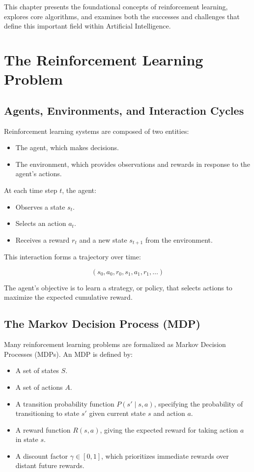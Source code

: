 \documentclass[openany]{book}
\begin{document}
This chapter presents the foundational concepts of reinforcement learning, 
explores core algorithms, and examines both the successes and challenges that 
define this important field within Artificial Intelligence.

\section{The Reinforcement Learning Problem}

\subsection{Agents, Environments, and Interaction Cycles}

Reinforcement learning systems are composed of two entities:

\begin{itemize}
    \item The agent, which makes decisions.
    \item The environment, which provides observations and rewards in response 
    to the agent's actions.
\end{itemize}

At each time step \( t \), the agent:

\begin{itemize}
    \item Observes a state \( s_t \).
    \item Selects an action \( a_t \).
    \item Receives a reward \( r_t \) and a new state \( s_{t+1} \) from the
     environment.
\end{itemize}

This interaction forms a trajectory over time:

\[
(s_0, a_0, r_0, s_1, a_1, r_1, \dots)
\]

The agent's objective is to learn a strategy, or policy, that selects actions 
to maximize the expected cumulative reward.

\subsection{The Markov Decision Process (MDP)}

Many reinforcement learning problems are formalized as Markov Decision Processes
(MDPs). An MDP is defined by:

\begin{itemize}
    \item A set of states \( S \).
    \item A set of actions \( A \).
    \item A transition probability function \( P(s' \mid s, a) \), specifying 
    the probability of transitioning to state \( s' \) given current state 
    \( s \) and action \( a \).
    \item A reward function \( R(s,a) \), giving the expected reward for taking 
    action \( a \) in state \( s \).
    \item A discount factor \( \gamma \in [0,1] \), which prioritizes immediate 
    rewards over distant future rewards.
\end{itemize}
\end{document}
